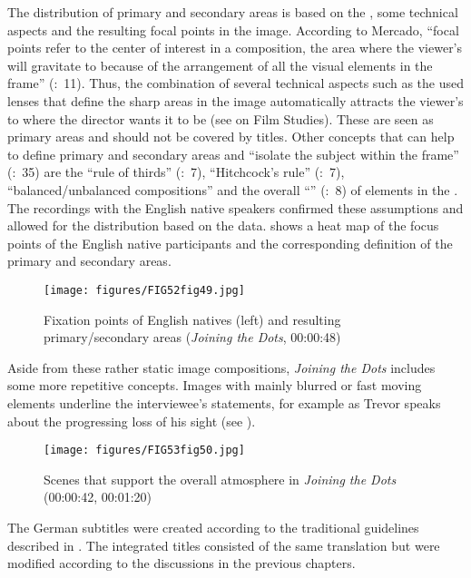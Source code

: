 The distribution of primary and secondary areas is based on the , some technical aspects and the resulting focal points in the image. According to Mercado, “focal points refer to the center of interest in a composition, the area where the viewer’s  will gravitate to because of the arrangement of all the visual elements in the frame” (\citeyear{mercado2010}:~11). Thus, the combination of several technical aspects such as the used lenses that define the sharp areas in the image automatically attracts the viewer’s  to where the director wants it to be (see  on Film Studies). These are seen as primary areas and should not be covered by titles. Other concepts that can help to define primary and secondary areas and “isolate the subject within the frame” (\citeyear{mercado2010}:~35) are the “rule of thirds” (\citeyear{mercado2010}:~7), “Hitchcock’s rule” (\citeyear{mercado2010}:~7), “balanced/unbalanced compositions” and the overall “” (\citeyear{mercado2010}:~8) of elements in the . The  recordings with the English native speakers confirmed these assumptions and allowed for the distribution based on the  data.  shows a heat map of the focus points of the English native participants and the corresponding definition of the primary and secondary areas.

\begin{figure}
\texttt{[image: figures/FIG52fig49.jpg]}
\caption{Fixation points of English natives (left) and resulting primary/secondary areas (\textit{Joining the Dots}, 00:00:48)}
\label{fig:FIG52fig49}
\end{figure}

Aside from these rather static image compositions, \textit{Joining the Dots} includes some more repetitive concepts. Images with mainly blurred or fast moving elements underline the interviewee’s statements, for example as Trevor speaks about the progressing loss of his sight (see ).

\begin{figure}
\texttt{[image: figures/FIG53fig50.jpg]}
\caption{Scenes that support the overall atmosphere in \textit{Joining the Dots} (00:00:42, 00:01:20)}
\label{fig:FIG53fig50}
\end{figure}
 

The German subtitles were created according to the traditional guidelines described in . The integrated titles consisted of the same translation but were modified according to the discussions in the previous chapters.


